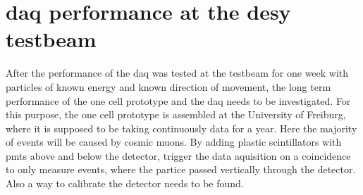 \chapter{\ac{daq} performance at the \ac{desy} testbeam}








After the performance of the \ac{daq} was tested at the testbeam for one week with particles of known energy and known direction of movement, the long term performance of the one cell prototype and the \ac{daq} needs to be investigated.
For this purpose, the one cell prototype is assembled at the University of Freiburg, where it is supposed to be taking continuously data for a year.
Here the majority of events will be caused by cosmic muons.
By adding plastic scintillators with \acp{pmt} above and below the detector, trigger the data aquisition on a coincidence to only measure events, where the partice passed vertically through the detector.
Also a way to calibrate the detector needs to be found.
